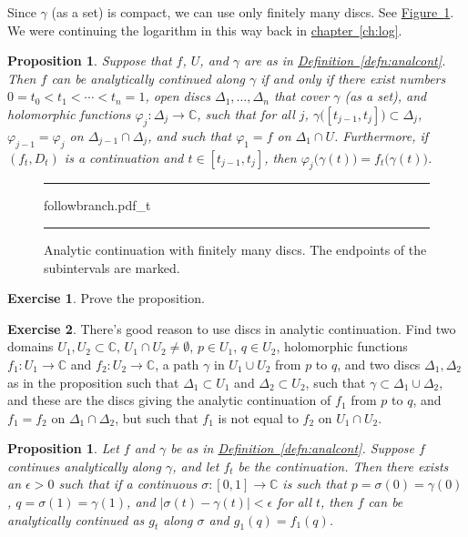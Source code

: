 \documentclass[12pt,openany]{book}
\newcommand{\sabs}[1]{\lvert {#1} \rvert}
\newcommand{\C}{{\mathbb{C}}}
\theoremstyle{plain}
\newtheorem{prop}[thm]{Proposition}
\theoremstyle{remark}
\theoremstyle{definition}
\newenvironment{exbox}{%
    \def\FrameCommand{\vrule width 1pt \relax\hspace{10pt}}%
    \MakeFramed{\advance\hsize-\width\FrameRestore}%
}{%
    \endMakeFramed
}
\newenvironment{myfig}{%
\begin{figure}[h!t]
\noindent\rule{\textwidth}{0.5pt}\vspace{12pt}\par\centering}%
{\par\noindent\rule{\textwidth}{0.5pt}
\end{figure}}
\theoremstyle{exercise}
\newtheorem{exercise}{Exercise}[section]
\theoremstyle{example}
\newcommand{\figureref}[1]{\hyperref[#1]{Figure~\ref*{#1}}}
\newcommand{\chapterref}[1]{\hyperref[#1]{chapter~\ref*{#1}}}
\newcommand{\defnref}[1]{\hyperref[#1]{Definition~\ref*{#1}}}
\begin{document}
Since $\gamma$ (as a set) is compact, we can use only finitely many
discs.  See \figureref{fig:followbranch2}.
We were continuing the logarithm in this way back in
\chapterref{ch:log}.

\begin{prop} \label{prop:finitedisccont}
Suppose that $f$, $U$, and $\gamma$ are as in \defnref{defn:analcont}.
Then
$f$ can be analytically continued along $\gamma$
if and only if there exist numbers $0 = t_0 < t_1 < \cdots < t_n = 1$,
open discs
$\Delta_1,\ldots,\Delta_n$ that cover $\gamma$ (as a set),
and holomorphic functions $\varphi_j \colon \Delta_j \to \C$,
such that for all $j$, $\gamma\bigl([t_{j-1},t_j]\bigr) \subset \Delta_j$,
$\varphi_{j-1} = \varphi_j$ on $\Delta_{j-1} \cap \Delta_j$,
and such that $\varphi_1 = f$ on $\Delta_1 \cap U$.
Furthermore, if $(f_t,D_t)$ is a continuation and $t \in [t_{j-1},t_j]$,
then $\varphi_j\bigl(\gamma(t)\bigr) = f_t\bigl(\gamma(t)\bigr)$.
\end{prop}

\begin{myfig}
{followbranch.pdf_t}
\caption{Analytic continuation with finitely many discs.  The endpoints of
the subintervals are marked.\label{fig:followbranch2}}
\end{myfig}

\begin{exbox}
\begin{exercise}
Prove the proposition.
\end{exercise}

\begin{exercise}
There's good reason to use discs in analytic continuation.  Find two domains
$U_1, U_2 \subset \C$, $U_1 \cap U_2 \not= \emptyset$,
$p \in U_1$, $q \in U_2$, holomorphic functions
$f_1 \colon U_1 \to \C$ and $f_2 \colon U_2 \to \C$,
a path $\gamma$ in $U_1 \cup U_2$ from $p$ to $q$, and two discs $\Delta_1,\Delta_2$
as in the proposition such that $\Delta_1 \subset U_1$ and $\Delta_2 \subset
U_2$, such that $\gamma \subset \Delta_1 \cup \Delta_2$, and these are the
discs giving the analytic continuation of $f_1$ from $p$ to $q$, and $f_1 =
f_2$ on $\Delta_1 \cap \Delta_2$, but such that $f_1$ is not equal to $f_2$
on $U_1 \cap U_2$.
\end{exercise}
\end{exbox}

\begin{prop} \label{prop:continuationclose}
Let $f$ and $\gamma$ be as in \defnref{defn:analcont}.
Suppose $f$ continues analytically along $\gamma$, and let
$f_t$ be the continuation.
Then there exists an $\epsilon > 0$ such that if
a continuous
$\sigma \colon [0,1] \to \C$ is such that $p=\sigma(0)=\gamma(0)$,
$q=\sigma(1)=\gamma(1)$, and
$\sabs{\sigma(t)-\gamma(t)} < \epsilon$ for all $t$,
then
$f$ can be analytically continued as $g_t$ along $\sigma$ and
$g_1(q)=f_1(q)$.
\end{prop}
\end{document}
